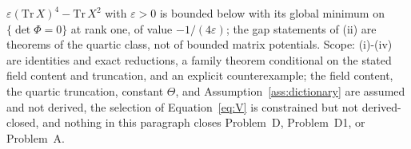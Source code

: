 \(\varepsilon(\mathrm{Tr}\,X)^4-\mathrm{Tr}\,X^2\) with \(\varepsilon>0\) is bounded below with its global minimum on \(\{\det\Phi=0\}\) at rank one, of value \(-1/(4\varepsilon)\); the gap statements of (ii) are theorems of the quartic class, not of bounded matrix potentials. Scope: (i)-(iv) are identities and exact reductions, a family theorem conditional on the stated field content and truncation, and an explicit counterexample; the field content, the quartic truncation, constant \(\Theta\), and Assumption~\ref{ass:dictionary} are assumed and not derived, the selection of Equation~\eqref{eq:V} is constrained but not derived-closed, and nothing in this paragraph closes Problem~D, Problem~D1, or Problem~A.
